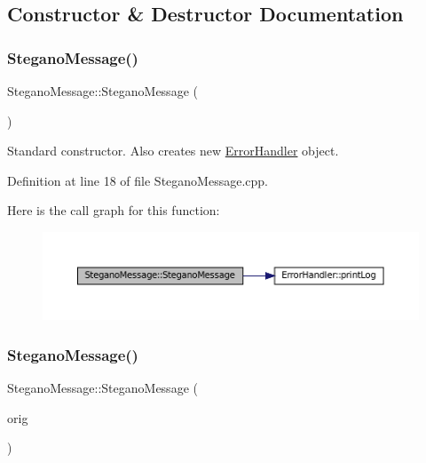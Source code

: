 \subsection{Constructor \& Destructor Documentation}
\mbox{\label{classSteganoMessage_a7a14cbd03ebca6764f8b234f8dcd1697}} 
\subsubsection{\texorpdfstring{SteganoMessage()}{SteganoMessage()}\hspace{0.1cm}{\footnotesize\ttfamily [1/2]}}
{\footnotesize\ttfamily Stegano\+Message\+::\+Stegano\+Message (\begin{DoxyParamCaption}{ }\end{DoxyParamCaption})}



Standard constructor. Also creates new \mbox{\hyperlink{classErrorHandler}{Error\+Handler}} object. 



Definition at line 18 of file Stegano\+Message.\+cpp.

Here is the call graph for this function\+:\nopagebreak
\begin{figure}[H]
\begin{center}
\leavevmode
\includegraphics[width=350pt]{classSteganoMessage_a7a14cbd03ebca6764f8b234f8dcd1697_cgraph}
\end{center}
\end{figure}
\mbox{\label{classSteganoMessage_a67a8a4a8aae12db32bb758e6cd44b16a}} 
\subsubsection{\texorpdfstring{SteganoMessage()}{SteganoMessage()}\hspace{0.1cm}{\footnotesize\ttfamily [2/2]}}
{\footnotesize\ttfamily Stegano\+Message\+::\+Stegano\+Message (\begin{DoxyParamCaption}\item[{const \mbox{\hyperlink{classSteganoMessage}{Stegano\+Message}} \&}]{orig }\end{DoxyParamCaption})}



